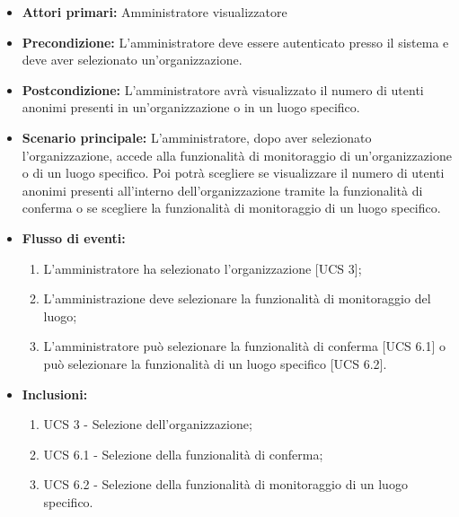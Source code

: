 \begin{itemize}
	\item \textbf{Attori primari:} Amministratore visualizzatore
	\item \textbf{Precondizione:} L'amministratore deve essere autenticato presso il sistema e deve aver selezionato un'organizzazione.
	\item \textbf{Postcondizione:} L'amministratore avrà visualizzato il numero di utenti anonimi presenti in un'organizzazione o in un luogo specifico.
	\item \textbf{Scenario principale:} L'amministratore, dopo aver selezionato l'organizzazione, accede alla funzionalità di monitoraggio di un'organizzazione o di un luogo specifico. Poi potrà scegliere se visualizzare il numero di utenti anonimi presenti all'interno dell'organizzazione tramite la funzionalità di conferma o se scegliere la funzionalità di monitoraggio di un luogo specifico.
	\item \textbf{Flusso di eventi:}
\begin{enumerate}
	\item L'amministratore ha selezionato l'organizzazione [UCS 3];
	\item L'amministrazione deve selezionare la funzionalità di monitoraggio del luogo;
	\item L'amministratore può selezionare la funzionalità di conferma [UCS 6.1] o può selezionare la funzionalità di un luogo specifico [UCS 6.2].
\end{enumerate}
\item \textbf{Inclusioni:}
\begin{enumerate}
    \item UCS 3 - Selezione dell'organizzazione;
    \item UCS 6.1 - Selezione della funzionalità di conferma;
    \item UCS 6.2 - Selezione della funzionalità di monitoraggio di un luogo specifico.
\end{enumerate}
\end{itemize}

